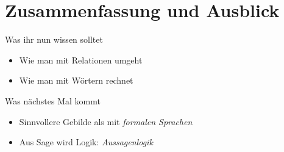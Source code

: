 


\appendix
\beginbackup

\section{Zusammenfassung und Ausblick}

\begin{frame}	
	\begin{block}{Was ihr nun wissen solltet}
		\begin{itemize}
			\item Wie man mit Relationen umgeht
			\item Wie man mit Wörtern rechnet
		\end{itemize}
	\end{block}
	
	\begin{block}{Was nächstes Mal kommt}
		\begin{itemize}
			\item Sinnvollere Gebilde als  mit \emph{formalen Sprachen}
			\item Aus Sage wird Logik: \emph{Aussagenlogik}
		\end{itemize}
	\end{block}
\end{frame}




\backupend

